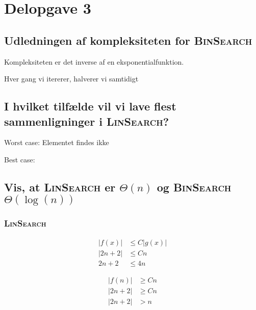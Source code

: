 \section{Delopgave 3}\label{sec:delopgave-32}

\subsection{Udledningen af kompleksiteten for \textsc{BinSearch}}
\label{subsec:udledningen-af-kompleksiteten-for-binsearch}

Kompleksiteten er det inverse af en eksponentialfunktion.

Hver gang vi itererer, halverer vi samtidigt \subsection{I hvilket tilfælde vil vi lave flest sammenligninger i
    \textsc{LinSearch}?
}
\label{subsec:i-hvilket-tilflde-vil-vi-lave-flest-sammenligninger-i-linsearch}

Worst case: Elementet findes ikke

Best case:

\subsection{Vis, at \textsc{LinSearch} er \(\Theta(n)\) og \textsc{BinSearch} \(\Theta(\log(n))\)}
\label{subsec:vis-at-linsearch-er-theta-n-og-binsearch-theta-log-n}

\subsubsection{\textsc{LinSearch}}

\begin{equation}
    \begin{aligned}
        | f(x) |   & \leq C | g(x) | \\
        | 2n + 2 | & \leq Cn         \\
        2n + 2     & \leq 4n
    \end{aligned}\label{eq:equation13}
\end{equation}

\begin{equation}
    \begin{aligned}
        | f(n) |   & \geq Cn \\
        | 2n + 2 | & \geq Cn \\
        | 2n + 2 | & > n
    \end{aligned}\label{eq:equation14}
\end{equation}

